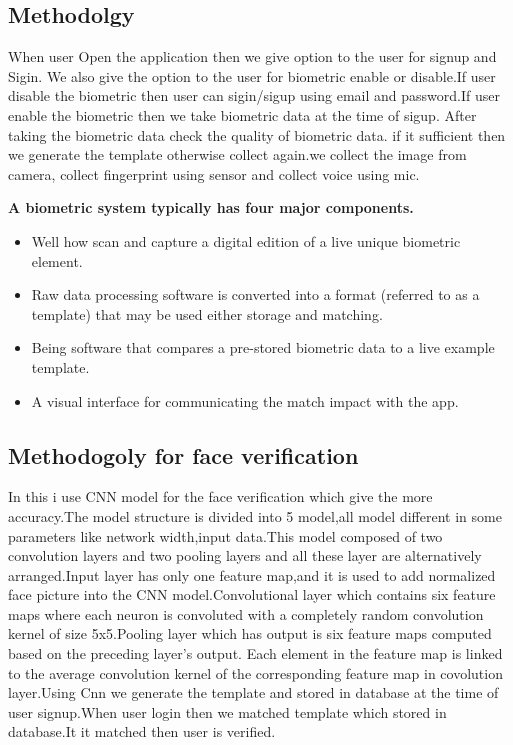 \documentclass[conference]{IEEEtran}
\begin{document}
\subsection{Methodolgy}\label{AA}
When user Open the application then we give option to the user for signup and Sigin. We also give the option to the user for biometric enable or disable.If user disable the biometric then user can sigin/sigup using email and password.If user enable the biometric then we take biometric data at the time of sigup. After taking the biometric data check the quality of biometric data. if it sufficient then we generate the template otherwise collect again.we collect the image from camera, collect fingerprint using sensor and collect voice using mic.
\linebreak

{\bf A biometric system typically has four major components.}
\begin{itemize}
	\item Well how scan and capture a digital edition of a live unique biometric element.
	\item Raw data processing software is converted into a format (referred to as a template) that may be used either storage and matching.
	\item Being software that compares a pre-stored biometric data to a live example template.
	\item A visual interface for communicating the match impact with the app.
	
\end{itemize}

\subsection{Methodogoly for face verification}
In this i use CNN model for the face verification which give the more accuracy.The model structure is divided into 5 model,all model different in some parameters like network width,input data.This model composed of two convolution layers and two pooling layers and all these layer are alternatively arranged.Input layer has only one feature map,and it is used to add normalized face picture into the CNN model.Convolutional layer which contains six feature maps where each neuron is convoluted with a completely random convolution kernel of size 5x5.Pooling layer which has output is six feature maps computed based on the preceding layer's output. Each element in the feature map is linked to the average convolution kernel of the corresponding feature map in covolution layer.Using Cnn we generate the template and stored in database at the time of user signup.When user login then we matched template which stored in database.It it matched then user is verified.
\end{document}
